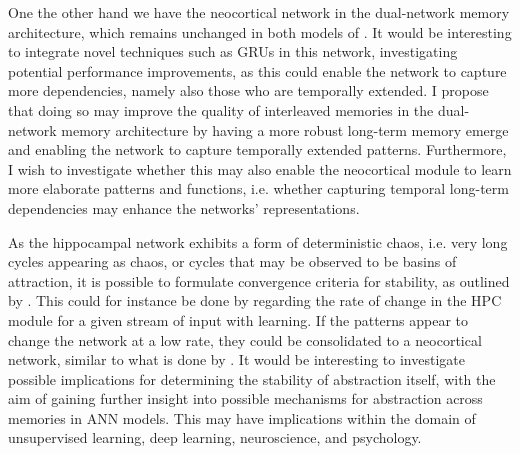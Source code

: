 One the other hand we have the neocortical network in the dual-network memory architecture, which remains unchanged in both models of \cite{Hattori2010, Hattori2014}. It would be interesting to integrate novel techniques such as GRUs in this network, investigating potential performance improvements, as this could enable the network to capture more dependencies, namely also those who are temporally extended.
I propose that doing so may improve the quality of interleaved memories in the dual-network memory architecture by having a more robust long-term memory emerge and enabling the network to capture temporally extended patterns. Furthermore, I wish to investigate whether this may also enable the neocortical module to learn more elaborate patterns and functions, i.e. whether capturing temporal long-term dependencies may enhance the networks' representations.

As the hippocampal network exhibits a form of deterministic chaos, i.e. very long cycles appearing as chaos, or cycles that may be observed to be basins of attraction, it is possible to formulate convergence criteria for stability, as outlined by \cite{Hattori2014}. This could for instance be done by regarding the rate of change in the HPC module for a given stream of input with learning. If the patterns appear to change the network at a low rate, they could be consolidated to a neocortical network, similar to what is done by \cite{Hattori2014}. 
It would be interesting to investigate possible implications for determining the stability of abstraction itself, with the aim of gaining further insight into possible mechanisms for abstraction across memories in ANN models. This may have implications within the domain of unsupervised learning, deep learning, neuroscience, and psychology.

